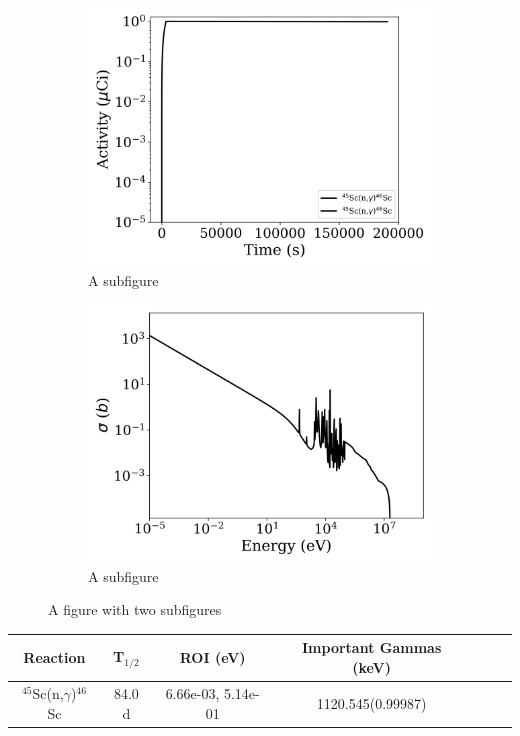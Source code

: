 \begin{figure}[h]
\centering
\begin{subfigure}{.5\textwidth}
  \centering
     \includegraphics[width=.8\textwidth]{plot/Sc-45(n,gamma)Sc-46_library1} 

  \caption{A subfigure}
  \label{fig:sub1}
\end{subfigure}%
\begin{subfigure}{.5\textwidth}
  \centering
     \includegraphics[width=.8\textwidth]{plot/Sc-45(n,gamma)Sc-46} 

  \caption{A subfigure}
  \label{fig:sub2}
\end{subfigure}
\caption{A figure with two subfigures}
\label{fig:test}
\end{figure}

\begin{table}[h]
\centering
\begin{tabular}{ |c|c|c|c|c|c|c| }
 \hline
 Reaction & T$_{1/2}$ & ROI (eV) & Important Gammas (keV) \\
 \hline 
 $^{45}$Sc(n,$\gamma$)$^{46}$Sc & 84.0 d & 6.66e-03, 5.14e-01 & 1120.545(0.99987) \\ 
\hline
\end{tabular}
\end{table}
